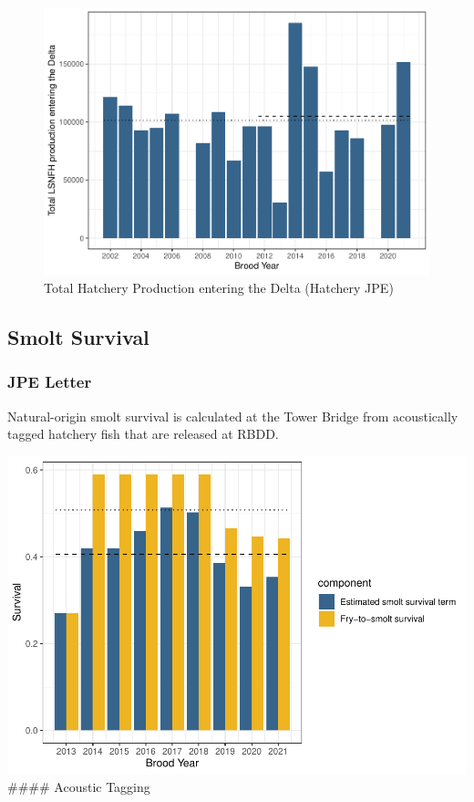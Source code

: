 \documentclass[
]{book}
\theoremstyle{definition}
\theoremstyle{definition}
\theoremstyle{definition}
\theoremstyle{definition}
\theoremstyle{remark}
\begin{document}
\begin{figure}
\centering
\includegraphics{_main_files/figure-latex/jpeH-fig-1.pdf}
\caption{\label{fig:jpeH-fig}Total Hatchery Production entering the Delta (Hatchery JPE)}
\end{figure}

\hypertarget{smolt-survival}{%
\subsection{Smolt Survival}\label{smolt-survival}}

\hypertarget{jpe-letter}{%
\subsubsection{JPE Letter}\label{jpe-letter}}

Natural-origin smolt survival is calculated at the Tower Bridge from acoustically tagged hatchery fish that are released at RBDD.

\includegraphics{_main_files/figure-latex/smoltsurvival-fig-1.pdf}
\#\#\#\# Acoustic Tagging
\end{document}
